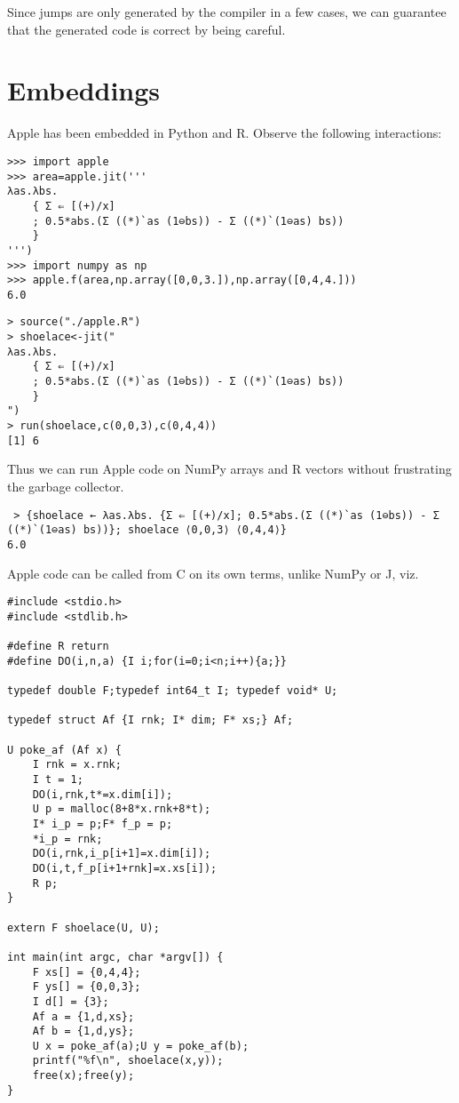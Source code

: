 \documentclass[sigplan,screen,anonymous]{acmart}
\begin{document}
Since jumps are only generated by the compiler in a few cases, we can guarantee that the generated code is correct by being careful.

\section{Embeddings}

Apple has been embedded in Python and R. Observe the following interactions:

\begin{verbatim}
>>> import apple
>>> area=apple.jit('''
λas.λbs.
    { Σ ⇐ [(+)/x]
    ; 0.5*abs.(Σ ((*)`as (1⊖bs)) - Σ ((*)`(1⊖as) bs))
    }
''')
>>> import numpy as np
>>> apple.f(area,np.array([0,0,3.]),np.array([0,4,4.]))
6.0
\end{verbatim}

\begin{verbatim}
> source("./apple.R")
> shoelace<-jit("
λas.λbs.
    { Σ ⇐ [(+)/x]
    ; 0.5*abs.(Σ ((*)`as (1⊖bs)) - Σ ((*)`(1⊖as) bs))
    }
")
> run(shoelace,c(0,0,3),c(0,4,4))
[1] 6
\end{verbatim}

Thus we can run Apple code on NumPy arrays and R vectors without frustrating the garbage collector.

\begin{verbatim}
 > {shoelace ← λas.λbs. {Σ ⇐ [(+)/x]; 0.5*abs.(Σ ((*)`as (1⊖bs)) - Σ ((*)`(1⊖as) bs))}; shoelace ⟨0,0,3⟩ ⟨0,4,4⟩}
6.0
\end{verbatim}

Apple code can be called from C on its own terms, unlike NumPy or J, viz.

\begin{verbatim}
#include <stdio.h>
#include <stdlib.h>

#define R return
#define DO(i,n,a) {I i;for(i=0;i<n;i++){a;}}

typedef double F;typedef int64_t I; typedef void* U;

typedef struct Af {I rnk; I* dim; F* xs;} Af;

U poke_af (Af x) {
    I rnk = x.rnk;
    I t = 1;
    DO(i,rnk,t*=x.dim[i]);
    U p = malloc(8+8*x.rnk+8*t);
    I* i_p = p;F* f_p = p;
    *i_p = rnk;
    DO(i,rnk,i_p[i+1]=x.dim[i]);
    DO(i,t,f_p[i+1+rnk]=x.xs[i]);
    R p;
}

extern F shoelace(U, U);

int main(int argc, char *argv[]) {
    F xs[] = {0,4,4};
    F ys[] = {0,0,3};
    I d[] = {3};
    Af a = {1,d,xs};
    Af b = {1,d,ys};
    U x = poke_af(a);U y = poke_af(b);
    printf("%f\n", shoelace(x,y));
    free(x);free(y);
}
\end{verbatim}
\end{document}
